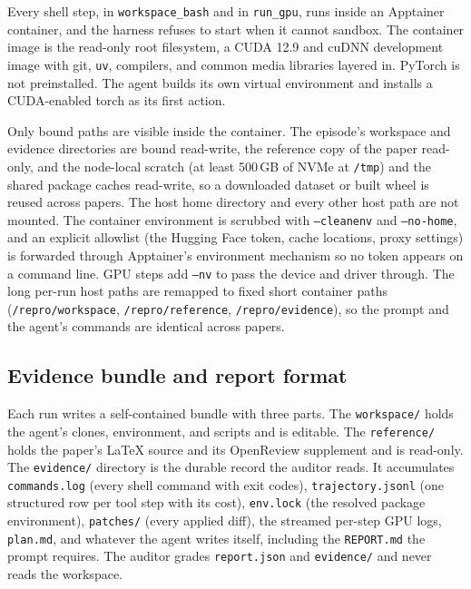 \documentclass{article} %
\begin{document}
Every shell step, in \texttt{workspace\_bash} and in \texttt{run\_gpu}, runs
inside an Apptainer container, and the harness refuses to start when it
cannot sandbox. The container image is the read-only root filesystem, a
CUDA 12.9 and cuDNN development image with git, \texttt{uv}, compilers, and
common media libraries layered in. PyTorch is not preinstalled. The agent
builds its own virtual environment and installs a CUDA-enabled torch as its
first action.

Only bound paths are visible inside the container. The episode's workspace
and evidence directories are bound read-write, the reference copy of the
paper read-only, and the node-local scratch (at least 500\,GB of NVMe at
\texttt{/tmp}) and the shared package caches read-write, so a downloaded
dataset or built wheel is reused across papers. The host home directory and
every other host path are not mounted. The container environment is scrubbed
with \texttt{--cleanenv} and \texttt{--no-home}, and an explicit allowlist
(the Hugging Face token, cache locations, proxy settings) is forwarded
through Apptainer's environment mechanism so no token appears on a command
line. GPU steps add \texttt{--nv} to pass the device and driver through. The
long per-run host paths are remapped to fixed short container paths
(\texttt{/repro/workspace}, \texttt{/repro/reference},
\texttt{/repro/evidence}), so the prompt and the agent's commands are
identical across papers.

\subsection{Evidence bundle and report format}
\label{app:report-format}

Each run writes a self-contained bundle with three parts. The
\texttt{workspace/} holds the agent's clones, environment, and scripts and
is editable. The \texttt{reference/} holds the paper's \LaTeX{} source and
its OpenReview supplement and is read-only. The \texttt{evidence/} directory
is the durable record the auditor reads. It accumulates
\texttt{commands.log} (every shell command with exit codes),
\texttt{trajectory.jsonl} (one structured row per tool step with its cost),
\texttt{env.lock} (the resolved package environment), \texttt{patches/}
(every applied diff), the streamed per-step GPU logs, \texttt{plan.md}, and
whatever the agent writes itself, including the \texttt{REPORT.md} the
prompt requires. The auditor grades \texttt{report.json} and
\texttt{evidence/} and never reads the workspace.
\end{document}
